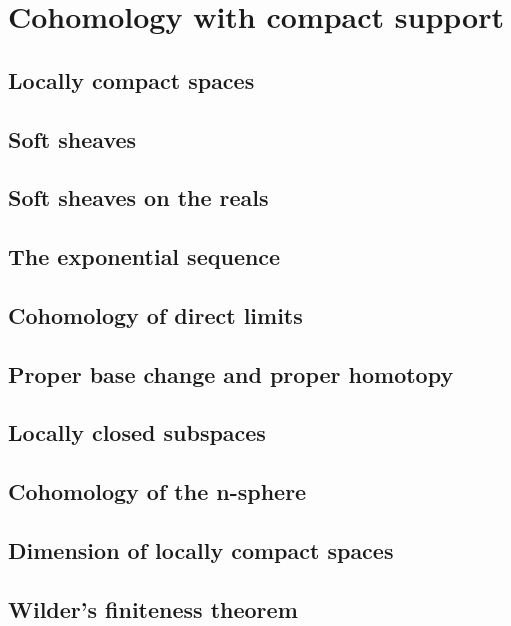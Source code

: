 \documentclass[5pt]{article}
\theoremstyle{definition}
\theoremstyle{remark}
\begin{document}
	\section{Cohomology with compact support}
	
	\subsection{Locally compact spaces}
	
	\subsection{Soft sheaves}
	
	\subsection{Soft sheaves on the reals}
	
	\subsection{The exponential sequence}
	
	\subsection{Cohomology of direct limits}
	
	\subsection{Proper base change and proper homotopy}
	
	\subsection{Locally closed subspaces}
	
	\subsection{Cohomology of the n-sphere}
	
	\subsection{Dimension of locally compact spaces}
	
	\subsection{Wilder's finiteness theorem}
	
\end{document}
